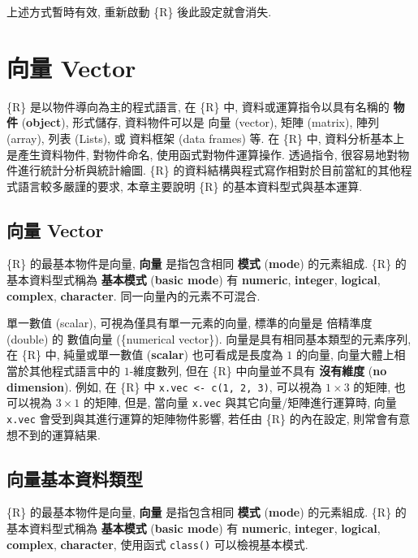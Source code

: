 \documentclass[
]{book}
\begin{document}
上述方式暫時有效, 重新啟動 \{R\} 後此設定就會消失.

\hypertarget{ux5411ux91cf-vector}{%
\chapter{向量 Vector}\label{ux5411ux91cf-vector}}

\{R\} 是以物件導向為主的程式語言,
在 \{R\} 中, 資料或運算指令以具有名稱的
\textbf{物件}
(\textbf{object}),
形式儲存,
資料物件可以是 向量 (vector),
矩陣 (matrix),
陣列 (array),
列表 (Lists),
或 資料框架 (data frames) 等.
在 \{R\} 中, 資料分析基本上是產生資料物件,
對物件命名, 使用函式對物件運算操作.
透過指令, 很容易地對物件進行統計分析與統計繪圖.
\{R\} 的資料結構與程式寫作相對於目前當紅的其他程式語言較多嚴謹的要求,
本章主要說明 \{R\} 的基本資料型式與基本運算.

\hypertarget{ux5411ux91cf-vector-1}{%
\section{向量 Vector}\label{ux5411ux91cf-vector-1}}

\{R\} 的最基本物件是向量,
\textbf{向量}
是指包含相同
\textbf{模式}
(\textbf{mode})
的元素組成.
\{R\} 的基本資料型式稱為
\textbf{基本模式}
(\textbf{basic mode}) 有
\textbf{numeric}, \textbf{integer}, \textbf{logical}, \textbf{complex}, \textbf{character}.
同一向量內的元素不可混合.

單一數值 (scalar), 可視為僅具有單一元素的向量,
標準的向量是
倍精準度 (double) 的
數值向量
(\{numerical vector\}).
向量是具有相同基本類型的元素序列,
在 \{R\} 中, 純量或單一數值
(\textbf{scalar})
也可看成是長度為 \(1\) 的向量,
向量大體上相當於其他程式語言中的 \(1\)-維度數列,
但在 \{R\} 中向量並不具有
\textbf{沒有維度}
(\textbf{no dimension}).
例如, 在 \{R\} 中 \texttt{x.vec\ \textless{}-\ c(1,\ 2,\ 3)},
可以視為 \(1 \times 3\) 的矩陣,
也可以視為 \(3 \times 1\) 的矩陣,
但是, 當向量 \texttt{x.vec} 與其它向量/矩陣進行運算時,
向量 \texttt{x.vec} 會受到與其進行運算的矩陣物件影響,
若任由 \{R\} 的內在設定,
則常會有意想不到的運算結果.

\hypertarget{ux5411ux91cfux57faux672cux8cc7ux6599ux985eux578b}{%
\section{向量基本資料類型}\label{ux5411ux91cfux57faux672cux8cc7ux6599ux985eux578b}}

\{R\} 的最基本物件是向量,
\textbf{向量}
是指包含相同
\textbf{模式}
(\textbf{mode})
的元素組成.
\{R\} 的基本資料型式稱為
\textbf{基本模式}
(\textbf{basic mode}) 有
\textbf{numeric}, \textbf{integer}, \textbf{logical}, \textbf{complex}, \textbf{character},
使用函式 \texttt{class()} 可以檢視基本模式.
\end{document}
